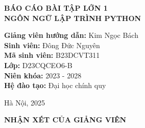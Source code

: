 \documentclass[12pt]{report}
\begin{document}
\begin{titlepage}
    \vspace{1cm}
{\Large \textbf{BÁO CÁO BÀI TẬP LỚN 1}}\\[0.5cm]
{\LARGE \textbf{NGÔN NGỮ LẬP TRÌNH PYTHON}}\\
    \vfill
    \begin{flushleft}
    \hspace{2.5cm}\textbf{Giảng viên hướng dẫn:} \hspace{0.7cm} Kim Ngọc Bách \\
    \hspace{2.5cm}\textbf{Sinh viên:} \hspace{3.35cm} Đông Đức Nguyên\\
    \hspace{2.5cm}\textbf{Mã sinh viên:} \hspace{2.6cm} B23DCVT311\\
    \hspace{2.5cm}\textbf{Lớp:} \hspace{4.5cm} D23CQCEO6-B\\
    \hspace{2.5cm}\textbf{Niên khóa:} \hspace{3.2cm} 2023 - 2028   \\
    \hspace{2.5cm}\textbf{Hệ đào tạo:} \hspace{3cm} Đại học chính quy\\
   
    \end{flushleft}
    
    \vfill
    {\large Hà Nội, 2025}
\end{titlepage}
\clearpage
{} 
\thispagestyle{empty}
\begin{center}
	{\textbf{\Large{NHẬN XÉT CỦA GIẢNG VIÊN }}}
\end{center}
\end{document}
